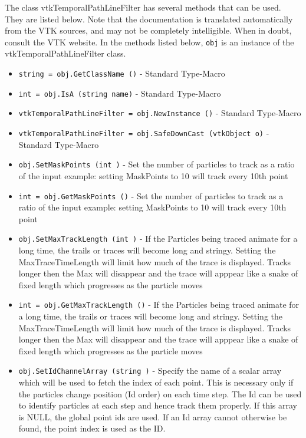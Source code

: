 The class vtkTemporalPathLineFilter has several methods that can be used.
  They are listed below.
Note that the documentation is translated automatically from the VTK sources,
and may not be completely intelligible.  When in doubt, consult the VTK website.
In the methods listed below, \verb|obj| is an instance of the vtkTemporalPathLineFilter class.
\begin{itemize}
\item  \verb|string = obj.GetClassName ()| -  Standard Type-Macro

\item  \verb|int = obj.IsA (string name)| -  Standard Type-Macro

\item  \verb|vtkTemporalPathLineFilter = obj.NewInstance ()| -  Standard Type-Macro

\item  \verb|vtkTemporalPathLineFilter = obj.SafeDownCast (vtkObject o)| -  Standard Type-Macro

\item  \verb|obj.SetMaskPoints (int )| -  Set the number of particles to track as a ratio of the input
 example: setting MaskPoints to 10 will track every 10th point

\item  \verb|int = obj.GetMaskPoints ()| -  Set the number of particles to track as a ratio of the input
 example: setting MaskPoints to 10 will track every 10th point

\item  \verb|obj.SetMaxTrackLength (int )| -  If the Particles being traced animate for a long time, the
 trails or traces will become long and stringy. Setting
 the MaxTraceTimeLength will limit how much of the trace
 is displayed. Tracks longer then the Max will disappear
 and the trace will apppear like a snake of fixed length
 which progresses as the particle moves

\item  \verb|int = obj.GetMaxTrackLength ()| -  If the Particles being traced animate for a long time, the
 trails or traces will become long and stringy. Setting
 the MaxTraceTimeLength will limit how much of the trace
 is displayed. Tracks longer then the Max will disappear
 and the trace will apppear like a snake of fixed length
 which progresses as the particle moves

\item  \verb|obj.SetIdChannelArray (string )| -  Specify the name of a scalar array which will be used to fetch
 the index of each point. This is necessary only if the particles
 change position (Id order) on each time step. The Id can be used
 to identify particles at each step and hence track them properly.
 If this array is NULL, the global point ids are used.  If an Id
 array cannot otherwise be found, the point index is used as the ID.


\end{itemize}
